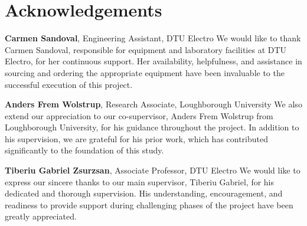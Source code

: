 \section*{Acknowledgements}

\textbf{Carmen Sandoval}, Engineering Assistant, DTU Electro \newline
We would like to thank Carmen Sandoval, responsible for equipment and laboratory facilities at DTU Electro, for her continuous support. Her availability, helpfulness, and assistance in sourcing and ordering the appropriate equipment have been invaluable to the successful execution of this project.

\textbf{Anders Frem Wolstrup}, Research Associate, Loughborough University \newline
We also extend our appreciation to our co-supervisor, Anders Frem Wolstrup from Loughborough University, for his guidance throughout the project. In addition to his supervision, we are grateful for his prior work, which has contributed significantly to the foundation of this study.

\textbf{Tiberiu Gabriel Zsurzsan}, Associate Professor, DTU Electro \newline
We would like to express our sincere thanks to our main supervisor, Tiberiu Gabriel, for his dedicated and thorough supervision. His understanding, encouragement, and readiness to provide support during challenging phases of the project have been greatly appreciated.